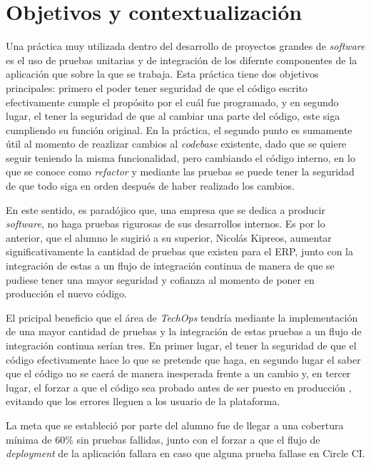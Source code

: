 \textit{}\section{Objetivos y contextualización}

  Una práctica muy utilizada dentro del desarrollo de proyectos grandes de \textit{software} es el uso de pruebas unitarias y de integración de los difernte componentes de la aplicación que sobre la que se trabaja. Esta práctica tiene dos objetivos principales: primero el poder tener seguridad de que el código escrito efectivamente cumple el propósito por el cuál fue programado, y en segundo lugar, el tener la seguridad de que al cambiar una parte del código, este siga cumpliendo su función original. En la práctica, el segundo punto es sumamente útil al momento de reazlizar cambios al \textit{codebase} existente, dado que se quiere seguir teniendo la misma funcionalidad, pero cambiando el código interno, en lo que se conoce como \textit{refactor} y mediante las pruebas se puede tener la seguridad de que todo siga en orden después de haber realizado los cambios. 
  
  En este sentido, es paradójico que, una empresa que se dedica a producir \textit{software}, no haga pruebas rigurosas de sus desarrollos internos. Es por lo anterior, que el alumno le sugirió a su superior, Nicolás Kipreos, aumentar significativamente la cantidad de pruebas que existen para el ERP, junto con la integración de estas a un flujo de integración continua de manera de que se pudiese tener una mayor seguridad y cofianza al momento de poner en producción el nuevo código.

  El pricipal beneficio que el área de \textit{TechOps} tendría mediante la implementación de una mayor cantidad de pruebas y la integración de estas pruebas a un flujo de integración continua serían tres. En primer lugar, el tener la seguridad de que el código efectivamente hace lo que se pretende que haga, en segundo lugar el saber que el código no se caerá de manera inesperada frente a un cambio y, en tercer lugar, el forzar a que el código sea probado antes de ser puesto en producción \cite{ibm_testing}, evitando que los errores lleguen a los usuario de la plataforma.

  La meta que se estableció por parte del alumno fue de llegar a una cobertura mínima de 60\% sin pruebas fallidas, junto con el forzar a que el flujo de \textit{deployment} de la aplicación fallara en caso que alguna prueba fallase en Circle CI.

